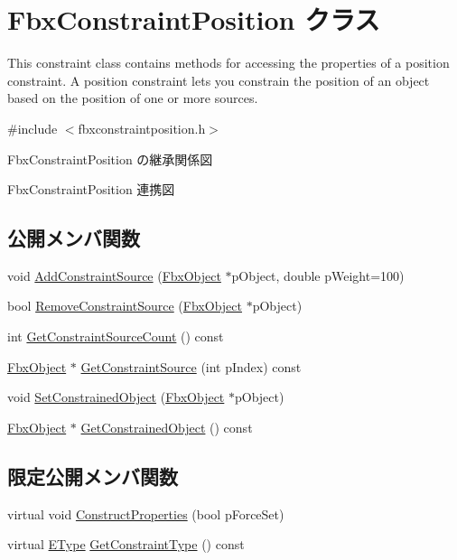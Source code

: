 \hypertarget{class_fbx_constraint_position}{}\section{Fbx\+Constraint\+Position クラス}
\label{class_fbx_constraint_position}


This constraint class contains methods for accessing the properties of a position constraint. A position constraint lets you constrain the position of an object based on the position of one or more sources.  




{\ttfamily \#include $<$fbxconstraintposition.\+h$>$}



Fbx\+Constraint\+Position の継承関係図


Fbx\+Constraint\+Position 連携図
\subsection*{公開メンバ関数}
\begin{DoxyCompactItemize}
\item 
void \hyperlink{class_fbx_constraint_position_a887955c9fefa271dcabb46e2c61ca9e1}{Add\+Constraint\+Source} (\hyperlink{class_fbx_object}{Fbx\+Object} $\ast$p\+Object, double p\+Weight=100)
\item 
bool \hyperlink{class_fbx_constraint_position_a7d496553504b797425ca2a055212f2ad}{Remove\+Constraint\+Source} (\hyperlink{class_fbx_object}{Fbx\+Object} $\ast$p\+Object)
\item 
int \hyperlink{class_fbx_constraint_position_a5f6c49200df6a7a1fe704084c2b56e09}{Get\+Constraint\+Source\+Count} () const
\item 
\hyperlink{class_fbx_object}{Fbx\+Object} $\ast$ \hyperlink{class_fbx_constraint_position_a0024d10c8464eba13d5f3c3037e973cf}{Get\+Constraint\+Source} (int p\+Index) const
\item 
void \hyperlink{class_fbx_constraint_position_a7a2604a668ec7cc7d0c04fd9cf29a01a}{Set\+Constrained\+Object} (\hyperlink{class_fbx_object}{Fbx\+Object} $\ast$p\+Object)
\item 
\hyperlink{class_fbx_object}{Fbx\+Object} $\ast$ \hyperlink{class_fbx_constraint_position_a2722540075ef79aa2d14e7e838afaf79}{Get\+Constrained\+Object} () const
\end{DoxyCompactItemize}
\subsection*{限定公開メンバ関数}
\begin{DoxyCompactItemize}
\item 
virtual void \hyperlink{class_fbx_constraint_position_adb2f3e784d01313ecc859b7cda16c182}{Construct\+Properties} (bool p\+Force\+Set)
\item 
virtual \hyperlink{class_fbx_constraint_a49c1634663395eab7c28856df233ec66}{E\+Type} \hyperlink{class_fbx_constraint_position_a79f710b1fec4b1285b53dec13ea68824}{Get\+Constraint\+Type} () const
\end{DoxyCompactItemize}
